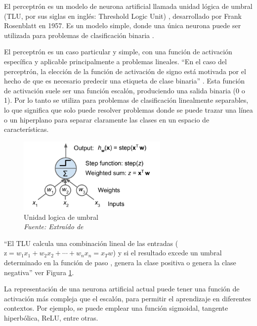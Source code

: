 El perceptrón es un modelo de neurona artificial llamada unidad lógica de umbral (TLU, por sus siglas en inglés: Threshold Logic Unit) , desarrollado por Frank Rosenblatt en 1957. Es un modelo simple, donde una única neurona puede ser utilizada para problemas de clasificación binaria \cite{rosenblatt1957perceptron}.

El perceptrón es un caso particular y simple, con una función de activación específica y aplicable principalmente a problemas lineales. “En el caso del perceptrón, la elección de la función de activación de signo está motivada por el hecho de que es necesario predecir una etiqueta de clase binaria” \cite[p. 11]{aggarwal2018neural}. Esta función de activación suele ser una función escalón, produciendo una salida binaria (0 o 1).  Por lo tanto se utiliza para problemas de clasificación linealmente separables, lo que significa que solo puede resolver problemas donde se puede trazar una línea o un hiperplano para separar claramente las clases en un espacio de características.

\begin{figure}[h!]
	
	\includegraphics[width=0.65\textwidth]{capitulo2/figuras/an4.png}
	\caption{Unidad logica de umbral
		\\\textit{Fuente: Extraído de} \protect\cite[p. 282]{geron2019hands}}
	\label{fig:an4}
\end{figure}

``El TLU calcula una combinación lineal de las entradas ( $\text{z} = w_1x_1 + w_2x_2 + \cdots + w_nx_n = x_Tw$) y si el resultado excede un umbral determinado en la función de paso , genera la clase positiva o genera la clase negativa''\cite[p. 282]{geron2019hands} ver Figura \ref{fig:an4}. 

La representación de una neurona artificial actual puede tener una función de activación más compleja que el escalón,  para permitir el aprendizaje en diferentes contextos. Por ejemplo, se puede emplear una función sigmoidal, tangente hiperbólica, ReLU, entre otras.






